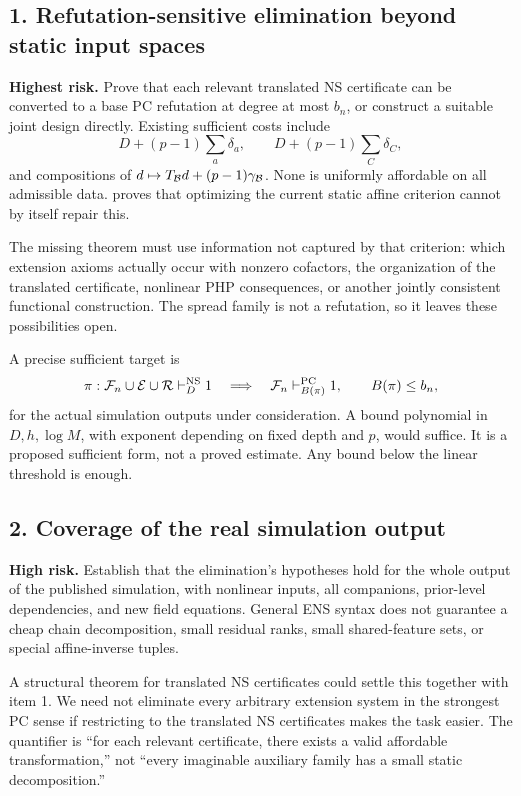 \subsection*{1. Refutation-sensitive elimination beyond static input spaces}
\textbf{Highest risk.} Prove that each relevant translated NS certificate can be converted to a base PC refutation at degree at most $b_n$, or construct a suitable joint design directly. Existing sufficient costs include
\[
 D+(p-1)\sum_a\delta_a,\qquad
 D+(p-1)\sum_C\delta_C,
\]
and compositions of $d\mapsto T_{\mathcal B}d+(p-1)\gamma_{\mathcal B}$. None is uniformly affordable on all admissible data.  proves that optimizing the current static affine criterion cannot by itself repair this.

The missing theorem must use information not captured by that criterion: which extension axioms actually occur with nonzero cofactors, the organization of the translated certificate, nonlinear PHP consequences, or another jointly consistent functional construction. The spread family is not a refutation, so it leaves these possibilities open.

A precise sufficient target is
\[
 \pi:\mathcal F_n\cup\mathcal E\cup\mathcal R\vdash_D^{\mathrm{NS}}1
 \quad\Longrightarrow\quad
 \mathcal F_n\vdash_{B(\pi)}^{\mathrm{PC}}1,\qquad B(\pi)\le b_n,
\]
for the actual simulation outputs under consideration. A bound polynomial in $D,h,\log M$, with exponent depending on fixed depth and $p$, would suffice. It is a proposed sufficient form, not a proved estimate. Any bound below the linear threshold is enough.

\subsection*{2. Coverage of the real simulation output}
\textbf{High risk.} Establish that the elimination's hypotheses hold for the whole output of the published simulation, with nonlinear inputs, all companions, prior-level dependencies, and new field equations. General ENS syntax does not guarantee a cheap chain decomposition, small residual ranks, small shared-feature sets, or special affine-inverse tuples.

A structural theorem for translated NS certificates could settle this together with item 1. We need not eliminate every arbitrary extension system in the strongest PC sense if restricting to the translated NS certificates makes the task easier. The quantifier is ``for each relevant certificate, there exists a valid affordable transformation,'' not ``every imaginable auxiliary family has a small static decomposition.''

